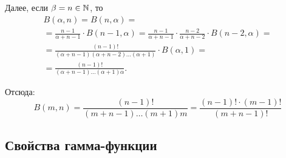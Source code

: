 \begin{enumerate}
\begin{note}
              Далее, если $ \beta = n \in \mathbb{N} $, то
              \begin{multline*}
                  B(\alpha,n) = B(n,\alpha) = \\
                  = \frac{n-1}{\alpha + n-1} \cdot B(n-1,\alpha) = \frac{n-1}{\alpha + n -1} \cdot \frac{n-2}{\alpha + n - 2} \cdot B(n-2,\alpha) = \\
                  = \frac{(n-1)!}{(\alpha+n-1)(\alpha + n -2)\ldots(\alpha +1)} \cdot B(\alpha,1) = \\
                  = \frac{(n-1)!}{(\alpha + n-1)\ldots(\alpha + 1)\alpha}.
              \end{multline*}

              Отсюда:
              \[
                  \boxed{B(m,n) = \frac{(n-1)!}{(m+n-1)\ldots(m+1)m} = \frac{(n-1)!\cdot(m-1)!}{(m+n-1)!}}
              \]
          \end{note}
\end{enumerate}

\subsection{Свойства гамма-функции}

